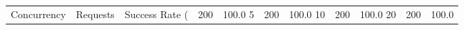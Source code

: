 \begin{tabular}{rrllllll}
\toprule
Concurrency & Requests & Success Rate (%
 & 200 & 100.0%
5 & 200 & 100.0%
10 & 200 & 100.0%
20 & 200 & 100.0%
\bottomrule
\end{tabular}
